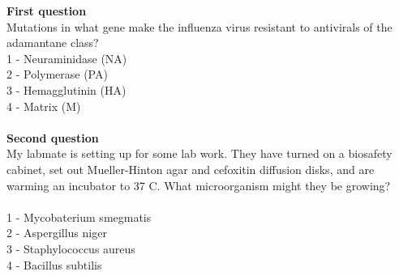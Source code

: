 \documentclass{article}
\begin{document}
\textbf{First question}\\
Mutations in what gene make the influenza virus resistant to antivirals of the adamantane class? \\
1 - Neuraminidase (NA)\\
2 - Polymerase (PA)\\
3 - Hemagglutinin (HA)\\
4 - Matrix (M)\\
\\
\textbf{Second question}\\
My labmate is setting up for some lab work. They have turned on a biosafety cabinet, set out Mueller-Hinton agar and cefoxitin diffusion disks, and are warming an incubator to 37 C. What microorganism might they be growing?\\
\\
1 - Mycobaterium smegmatis\\
2 - Aspergillus niger\\
3 - Staphylococcus aureus\\
4 - Bacillus subtilis\\
\end{document}
